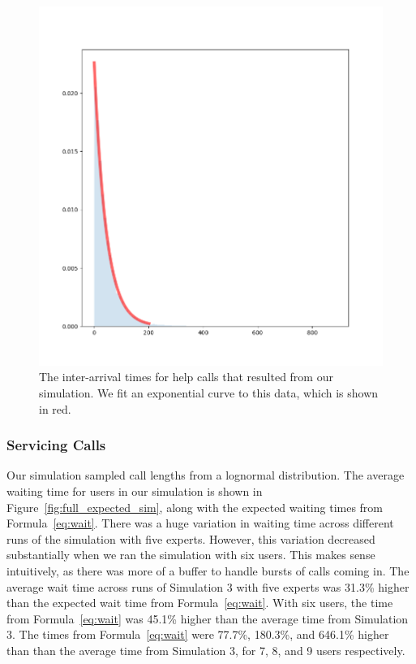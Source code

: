 \begin{figure}[H]
  \includegraphics[width=\textwidth]{figures/montecarlo/call_times.png}
  \caption{
    The inter-arrival times for help calls that resulted from our simulation.
    We fit an exponential curve to this data, which is shown in red.
  }\label{fig:step_patience}
\end{figure}

\subsubsection{Servicing Calls}

Our simulation sampled call lengths from a lognormal distribution.
The average waiting time for users in our simulation is shown in
Figure~\ref{fig:full_expected_sim}, along with the expected waiting times from
Formula~\ref{eq:wait}.
There was a huge variation in waiting time across different runs of the
simulation with five experts.
However, this variation decreased substantially when we ran the simulation with
six users.
This makes sense intuitively, as there was more of a buffer to handle bursts of
calls coming in.
The average wait time across runs of Simulation 3 with five experts was 31.3\%
higher than the expected wait time from Formula~\ref{eq:wait}.
With six users, the time from Formula~\ref{eq:wait} was 45.1\% higher than the
average time from Simulation 3.
The times from Formula~\ref{eq:wait} were 77.7\%, 180.3\%, and 646.1\% higher
than than the average time from Simulation 3, for 7, 8, and 9 users
respectively.

